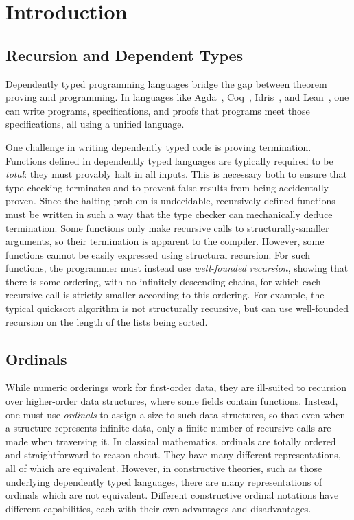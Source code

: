 \section{Introduction}
\label{sec:intro}

\subsection{Recursion and Dependent Types}
Dependently typed programming languages
 bridge the gap between theorem proving and programming.
In languages like Agda~\citep{agdaPaper}, Coq~\citep{coqart},
Idris~\citep{DBLP:journals/corr/abs-2104-00480}, and Lean~\citep{10.1007/978-3-319-21401-6_26},
 one can write programs, specifications, and proofs that programs
meet those specifications, all using a unified language.

One challenge in writing dependently typed code is proving termination.
Functions defined in dependently typed languages are typically required to be
\textit{total}: they must provably halt in all inputs.
This is necessary both to ensure that type checking terminates and to prevent
false results from being accidentally proven.
Since the halting problem
is undecidable, recursively-defined functions must be written in such a way that the type checker
can mechanically deduce termination.
Some functions only make recursive calls to structurally-smaller arguments,
so their termination is apparent to the compiler. However, some functions
cannot be easily expressed using structural recursion.
For such functions, the programmer must instead use \textit{well-founded recursion}, showing that there is some ordering, with no infinitely-descending
chains, for which each recursive call is strictly smaller according to this ordering. For example, the typical quicksort algorithm is not structurally recursive, but can use well-founded recursion on the length of the lists being sorted.

\subsection{Ordinals}

While numeric orderings work for first-order data, they are ill-suited to recursion over
higher-order data structures, where some fields contain functions.
Instead, one must use \textit{ordinals} to assign a size to such data structures, so that even
when a structure represents infinite data, only a finite number of recursive calls are made when traversing it.
In classical mathematics, ordinals are totally ordered and straightforward to reason about. They have
many different representations, all of which are equivalent.
However, in constructive theories, such as those underlying dependently typed languages,
there are many representations of ordinals which are not equivalent.
Different constructive ordinal notations have different capabilities, each with their own advantages and disadvantages.

